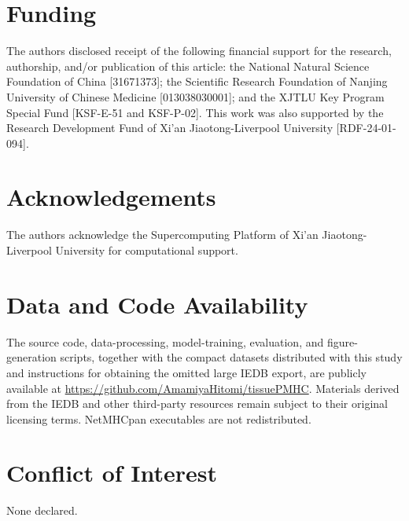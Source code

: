 \section*{Funding}

The authors disclosed receipt of the following financial support for the research, authorship, and/or publication of this article: the National Natural Science Foundation of China [31671373]; the Scientific Research Foundation of Nanjing University of Chinese Medicine [013038030001]; and the XJTLU Key Program Special Fund [KSF-E-51 and KSF-P-02]. This work was also supported by the Research Development Fund of Xi'an Jiaotong-Liverpool University [RDF-24-01-094].

\section*{Acknowledgements}

The authors acknowledge the Supercomputing Platform of Xi'an Jiaotong-Liverpool University for computational support.

\section*{Data and Code Availability}

The source code, data-processing, model-training, evaluation, and figure-generation scripts, together with the compact datasets distributed with this study and instructions for obtaining the omitted large IEDB export, are publicly available at \url{https://github.com/AmamiyaHitomi/tissuePMHC}. Materials derived from the IEDB and other third-party resources remain subject to their original licensing terms. NetMHCpan executables are not redistributed.

\section*{Conflict of Interest}

None declared.
